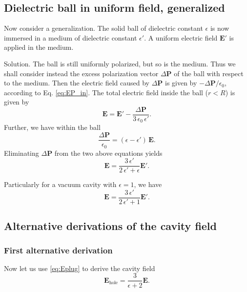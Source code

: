 \documentclass[11pt]{article}
\newcommand{\vct}[1]{\boldsymbol{\mathbf{#1}}}
\newcommand{\vE}{\vct{E}}
\newcommand{\vP}{\vct{P}}
\begin{document}
\subsection{Dielectric ball in uniform field, generalized}



Now consider a generalization.
%
The solid ball of dielectric constant $\epsilon$
is now immersed in a medium of dielectric constant $\epsilon'$.
%
A uniform electric field $\vE'$ is applied in the medium.

Solution.
The ball is still uniformly polarized,
but so is the medium.
Thus we shall consider instead
the excess polarization vector $\Delta\vP$
of the ball with respect to the medium.
%
Then the electric field caused by $\Delta\vP$
is given by $-\Delta\vP/\epsilon_0$,
according to Eq. \eqref{eq:EP_in}.
The total electric field inside the ball ($r < R$) is given by
\[
  \vE = \vE' - \frac{ \Delta \vP } { 3 \, \epsilon_0 \, \epsilon' }.
\]
Further, we have within the ball
\[
  \frac{ \Delta \vP } { \epsilon_0 }
  = \left( \epsilon - \epsilon' \right) \, \vE.
\]
Eliminating $\Delta \vP$ from the two above equations yields
\begin{equation}
  \vE = \frac{ 3 \, \epsilon' } {2 \, \epsilon' + \epsilon} \vE'.
  \label{eq:Eplug_general}
\end{equation}

Particularly for a vacuum cavity with $\epsilon = 1$,
we have
\begin{equation}
  \vE = \frac{ 3 \, \epsilon' } {2 \, \epsilon' + 1} \vE'.
  \label{eq:Ehole}
\end{equation}



\subsection{Alternative derivations of the cavity field}



\subsubsection{First alternative derivation}



Now let us use \eqref{eq:Eplug} to derive the cavity field
\[
  \vE_{\mathrm{hole}}
=
  \frac { 3 } { \epsilon + 2 }
  \vE.
\]
\end{document}
